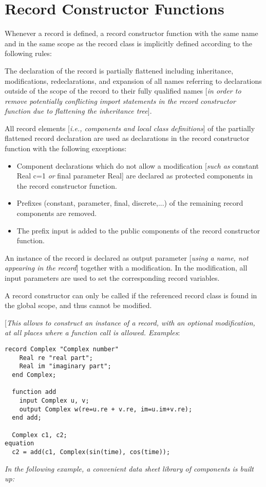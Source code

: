 \section{Record Constructor Functions}

Whenever a record is defined, a record constructor function with the
same name and in the same scope as the record class is implicitly
defined according to the following rules:

The declaration of the record is partially flattened including
inheritance, modifications, redeclarations, and expansion of all names
referring to declarations outside of the scope of the record to their
fully qualified names {[}\emph{in order to remove potentially
conflicting import statements in the record constructor function due to
flattening the inheritance tree}{]}.

All record elements {[}\emph{i.e., components and local class
definitions}{]} of the partially flattened record declaration are used
as declarations in the record constructor function with the following
exceptions:

\begin{itemize}
\item
  Component declarations which do not allow a modification {[}\emph{such
  as} constant Real c=1 \emph{or} final parameter Real{]} are declared
  as protected components in the record constructor function.
\item
  Prefixes (constant, parameter, final, discrete,...) of the remaining
  record components are removed.
\item
  The prefix input is added to the public components of the record
  constructor function.
\end{itemize}

An instance of the record is declared as output parameter {[}\emph{using
a name, not appearing in the record}{]} together with a modification. In
the modification, all input parameters are used to set the corresponding
record variables.

A record constructor can only be called if the referenced record class
is found in the global scope, and thus cannot be modified.

{[}\emph{This allows to construct an instance of a record, with an
optional modification, at all places where a function call is allowed.
Examples}:

\begin{lstlisting}[language=modelica]
  record Complex "Complex number"
    Real re "real part";
    Real im "imaginary part";
  end Complex;

  function add
    input Complex u, v;
    output Complex w(re=u.re + v.re, im=u.im+v.re);
  end add;

  Complex c1, c2;
equation
  c2 = add(c1, Complex(sin(time), cos(time));
\end{lstlisting}
\emph{In the following example, a convenient data sheet library of
components is built up:}

